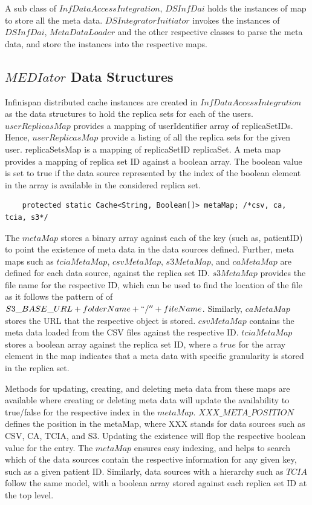 \documentclass[conference]{IEEEtran}
\begin{document}
A sub class of $InfDataAccessIntegration$, $DSInfDai$ holds the instances of map to store all the meta data. $DSIntegratorInitiator$ invokes the instances of $DSInfDai$, $MetaDataLoader$ and the other respective classes to parse the meta data, and store the instances into the respective maps. 

\subsection{$MEDIator$ Data Structures}
Infinispan distributed cache instances are created in $InfDataAccessIntegration$ as the data structures to hold the replica sets for each of the users. $userReplicasMap$ provides a mapping of userIdentifier  array of replicaSetIDs. Hence, $userReplicasMap$ provide a listing of all the replica sets for the given user. replicaSetsMap is a mapping of replicaSetID  replicaSet. A meta map provides a  mapping of replica set ID against a boolean array. The boolean value is set to true if the data source represented by the index of the boolean element in the array is available in the considered replica set.


\begin{lstlisting}  
    protected static Cache<String, Boolean[]> metaMap; /*csv, ca, tcia, s3*/
\end{lstlisting} 

The $metaMap$ stores a binary array against each of the key (such as, patientID) to point the existence of meta data in the data sources defined. Further, meta maps such as $tciaMetaMap$, $csvMetaMap$, $s3MetaMap$, and $caMetaMap$ are defined for each data source, against the replica set ID. $s3MetaMap$ provides the file name for the respective ID, which can be used to find the location of the file as it follows the pattern of of $S3\_BASE\_URL + folderName + ``/'' + fileName$. Similarly, $caMetaMap$ stores the URL that the respective object is stored. $csvMetaMap$ contains the meta data loaded from the CSV files against the respective ID. $tciaMetaMap$ stores a boolean array against the replica set ID, where a $true$ for the array element in the map indicates that a meta data with specific granularity is stored in the replica set.

Methods for updating, creating, and deleting meta data from these maps are available where creating or deleting meta data will update the availability to true/false for the respective index in the $metaMap$. $XXX\_META\_POSITION$ defines the position in the metaMap, where XXX stands for data sources such as CSV, CA, TCIA, and S3. Updating the existence will flop the respective boolean value for the entry. The $metaMap$ ensures easy indexing, and helps to search which of the data sources contain the respective information for any given key, such as a given patient ID. Similarly, data sources with a hierarchy such as $TCIA$ follow the same model, with a boolean array stored against each replica set ID at the top level.
\end{document}

